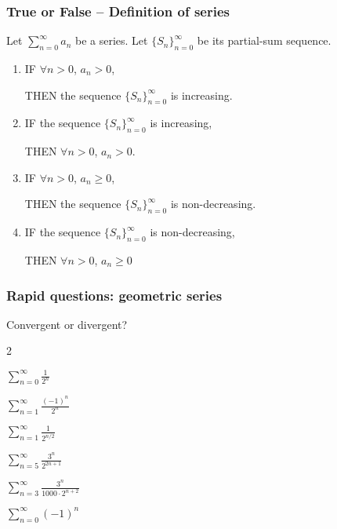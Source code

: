 \documentclass[14pt]{beamer}
\newcommand{\azul}[1]{{\color{blue} #1}}
\newcommand{\rojo}[1]{{\color{red} #1}}
\newcommand{\setsize}[1]{\fontsize{#1}{#1}\selectfont} %
\newcommand{\vv}{\vspace{.5cm}}
\newcommand{\vvv}{\vspace{.2cm}}
\begin{document}
	\begin{frame}[t]
		\setsize{12}
		\frametitle{True or False -- Definition of series}

		Let ${\displaystyle \sum_{n=0}^{\infty} a_n}$ be a series. Let
		${\displaystyle \{ S_n \}_{n=0}^{\infty}}$ be its partial-sum sequence.

		\begin{enumerate}
			\addtocounter{enumi}{3}

			\item IF \azul{${\displaystyle \forall n >0}$, ${\displaystyle a_n>0}$}, \vvv

				THEN \rojo{the sequence ${\displaystyle \{ S_n \}_{n=0}^{\infty}}$ is increasing}.
				\vv

			\item IF \rojo{the sequence ${\displaystyle \{ S_n \}_{n=0}^{\infty}}$ is increasing},
				\\ \vvv

				THEN \azul{${\displaystyle \forall n >0}$, ${\displaystyle a_n>0}$}. \vv

			\item IF \azul{${\displaystyle \forall n >0}$, ${\displaystyle a_n\geq0}$},
				\vvv

				THEN \rojo{the sequence ${\displaystyle \{ S_n \}_{n=0}^{\infty}}$ is non-decreasing}.

				\vv

			\item IF \rojo{the sequence ${\displaystyle \{ S_n \}_{n=0}^{\infty}}$ is non-decreasing},
				\\ \vvv

				THEN \azul{${\displaystyle \forall n >0}$, ${\displaystyle a_n\geq0}$}
		\end{enumerate}
	\end{frame}
	\begin{frame}[t]
		\frametitle{Rapid questions: geometric series}

		Convergent or divergent?

		\begin{enumerate}
		\end{enumerate}
	\end{frame}
\end{document}
